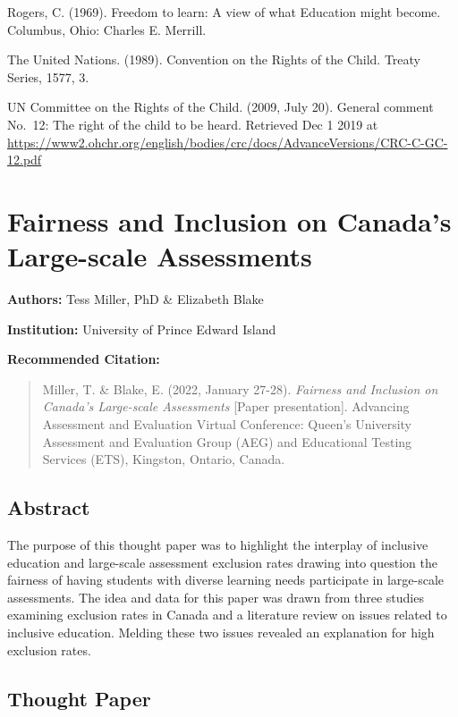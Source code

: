 \documentclass[
]{book}
\begin{document}
Rogers, C. (1969). Freedom to learn: A view of what Education might become. Columbus, Ohio: Charles E. Merrill.

The United Nations. (1989). Convention on the Rights of the Child. Treaty Series, 1577, 3.

UN Committee on the Rights of the Child. (2009, July 20). General comment No.~12: The right of the child to be heard. Retrieved Dec 1 2019 at \url{https://www2.ohchr.org/english/bodies/crc/docs/AdvanceVersions/CRC-C-GC-12.pdf}

\newpage

\hypertarget{fairness-and-inclusion-on-canadas-large-scale-assessments}{%
\section{Fairness and Inclusion on Canada's Large-scale Assessments}\label{fairness-and-inclusion-on-canadas-large-scale-assessments}}

\textbf{Authors:} Tess Miller, PhD \& Elizabeth Blake

\textbf{Institution:} University of Prince Edward Island

\textbf{Recommended Citation:}

\begin{quote}
Miller, T. \& Blake, E. (2022, January 27-28). \emph{Fairness and Inclusion on Canada's Large-scale Assessments} {[}Paper presentation{]}. Advancing Assessment and Evaluation Virtual Conference: Queen's University Assessment and Evaluation Group (AEG) and Educational Testing Services (ETS), Kingston, Ontario, Canada.
\end{quote}

\hypertarget{abstract}{%
\subsection{Abstract}\label{abstract}}

The purpose of this thought paper was to highlight the interplay of inclusive education and large-scale assessment exclusion rates drawing into question the fairness of having students with diverse learning needs participate in large-scale assessments. The idea and data for this paper was drawn from three studies examining exclusion rates in Canada and a literature review on issues related to inclusive education. Melding these two issues revealed an explanation for high exclusion rates.

\newpage

\hypertarget{thought-paper}{%
\subsection{Thought Paper}\label{thought-paper}}
\end{document}

